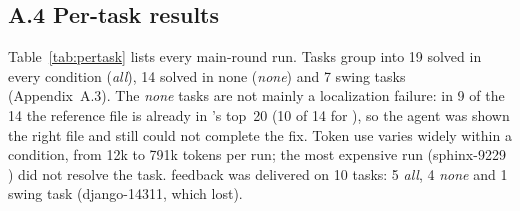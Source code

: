 \subsection*{A.4 Per-task results}
Table~\ref{tab:pertask} lists every main-round run. Tasks group into 19 solved in every condition
(\emph{all}), 14 solved in none (\emph{none}) and 7 swing tasks (Appendix~A.3). The \emph{none} tasks are
not mainly a localization failure: in 9 of the 14 the reference file is already in \condC's top~20
(10 of 14 for \condB), so the agent was shown the right file and still could not complete the fix.
Token use varies widely within a condition, from 12k to 791k tokens per run; the most expensive run
(sphinx-9229 \condC) did not resolve the task. \condD{} feedback was delivered on 10 tasks: 5 \emph{all},
4 \emph{none} and 1 swing task (django-14311, which \condD{} lost).

